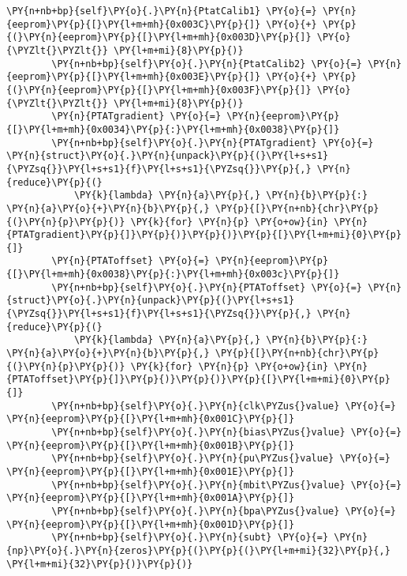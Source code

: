 \begin{tcolorbox}[breakable, size=fbox, boxrule=1pt, pad at break*=1mm,colback=cellbackground, colframe=cellborder]
\begin{Verbatim}[commandchars=\\\{\}]
		\PY{n+nb+bp}{self}\PY{o}{.}\PY{n}{PtatCalib1} \PY{o}{=} \PY{n}{eeprom}\PY{p}{[}\PY{l+m+mh}{0x003C}\PY{p}{]} \PY{o}{+} \PY{p}{(}\PY{n}{eeprom}\PY{p}{[}\PY{l+m+mh}{0x003D}\PY{p}{]} \PY{o}{\PYZlt{}\PYZlt{}} \PY{l+m+mi}{8}\PY{p}{)}
		\PY{n+nb+bp}{self}\PY{o}{.}\PY{n}{PtatCalib2} \PY{o}{=} \PY{n}{eeprom}\PY{p}{[}\PY{l+m+mh}{0x003E}\PY{p}{]} \PY{o}{+} \PY{p}{(}\PY{n}{eeprom}\PY{p}{[}\PY{l+m+mh}{0x003F}\PY{p}{]} \PY{o}{\PYZlt{}\PYZlt{}} \PY{l+m+mi}{8}\PY{p}{)}
		\PY{n}{PTATgradient} \PY{o}{=} \PY{n}{eeprom}\PY{p}{[}\PY{l+m+mh}{0x0034}\PY{p}{:}\PY{l+m+mh}{0x0038}\PY{p}{]}
		\PY{n+nb+bp}{self}\PY{o}{.}\PY{n}{PTATgradient} \PY{o}{=} \PY{n}{struct}\PY{o}{.}\PY{n}{unpack}\PY{p}{(}\PY{l+s+s1}{\PYZsq{}}\PY{l+s+s1}{f}\PY{l+s+s1}{\PYZsq{}}\PY{p}{,} \PY{n}{reduce}\PY{p}{(}
		    \PY{k}{lambda} \PY{n}{a}\PY{p}{,} \PY{n}{b}\PY{p}{:} \PY{n}{a}\PY{o}{+}\PY{n}{b}\PY{p}{,} \PY{p}{[}\PY{n+nb}{chr}\PY{p}{(}\PY{n}{p}\PY{p}{)} \PY{k}{for} \PY{n}{p} \PY{o+ow}{in} \PY{n}{PTATgradient}\PY{p}{]}\PY{p}{)}\PY{p}{)}\PY{p}{[}\PY{l+m+mi}{0}\PY{p}{]}
		\PY{n}{PTAToffset} \PY{o}{=} \PY{n}{eeprom}\PY{p}{[}\PY{l+m+mh}{0x0038}\PY{p}{:}\PY{l+m+mh}{0x003c}\PY{p}{]}
		\PY{n+nb+bp}{self}\PY{o}{.}\PY{n}{PTAToffset} \PY{o}{=} \PY{n}{struct}\PY{o}{.}\PY{n}{unpack}\PY{p}{(}\PY{l+s+s1}{\PYZsq{}}\PY{l+s+s1}{f}\PY{l+s+s1}{\PYZsq{}}\PY{p}{,} \PY{n}{reduce}\PY{p}{(}
		    \PY{k}{lambda} \PY{n}{a}\PY{p}{,} \PY{n}{b}\PY{p}{:} \PY{n}{a}\PY{o}{+}\PY{n}{b}\PY{p}{,} \PY{p}{[}\PY{n+nb}{chr}\PY{p}{(}\PY{n}{p}\PY{p}{)} \PY{k}{for} \PY{n}{p} \PY{o+ow}{in} \PY{n}{PTAToffset}\PY{p}{]}\PY{p}{)}\PY{p}{)}\PY{p}{[}\PY{l+m+mi}{0}\PY{p}{]}
		\PY{n+nb+bp}{self}\PY{o}{.}\PY{n}{clk\PYZus{}value} \PY{o}{=} \PY{n}{eeprom}\PY{p}{[}\PY{l+m+mh}{0x001C}\PY{p}{]}
		\PY{n+nb+bp}{self}\PY{o}{.}\PY{n}{bias\PYZus{}value} \PY{o}{=} \PY{n}{eeprom}\PY{p}{[}\PY{l+m+mh}{0x001B}\PY{p}{]}
		\PY{n+nb+bp}{self}\PY{o}{.}\PY{n}{pu\PYZus{}value} \PY{o}{=} \PY{n}{eeprom}\PY{p}{[}\PY{l+m+mh}{0x001E}\PY{p}{]}
		\PY{n+nb+bp}{self}\PY{o}{.}\PY{n}{mbit\PYZus{}value} \PY{o}{=} \PY{n}{eeprom}\PY{p}{[}\PY{l+m+mh}{0x001A}\PY{p}{]}
		\PY{n+nb+bp}{self}\PY{o}{.}\PY{n}{bpa\PYZus{}value} \PY{o}{=} \PY{n}{eeprom}\PY{p}{[}\PY{l+m+mh}{0x001D}\PY{p}{]}
		\PY{n+nb+bp}{self}\PY{o}{.}\PY{n}{subt} \PY{o}{=} \PY{n}{np}\PY{o}{.}\PY{n}{zeros}\PY{p}{(}\PY{p}{(}\PY{l+m+mi}{32}\PY{p}{,} \PY{l+m+mi}{32}\PY{p}{)}\PY{p}{)}
		

\end{Verbatim}
\end{tcolorbox}
